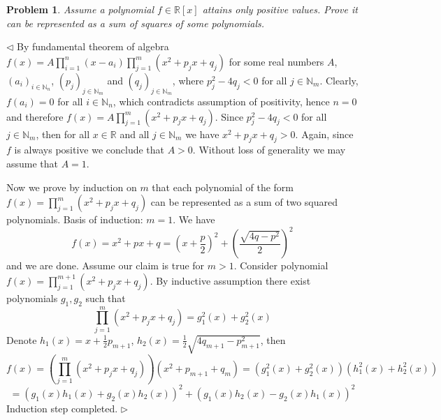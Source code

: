 \documentclass[12pt]{article}
\newtheorem{problem}{Problem}[subsection]
\newenvironment{solution}{\par $\triangleleft$}{$\triangleright$}
\begin{document}
\begin{problem} Assume a polynomial $f\in \mathbb{R}[x]$ attains only positive values. Prove it can be represented as a sum of squares of some polynomials.
\end{problem}
\begin{solution} By fundamental theorem of algebra
$f(x)=A\prod_{i=1}^n(x-a_i)\prod_{j=1}^m(x^2+p_jx+q_j)$
for some real numbers $A$, $(a_i)_{i\in\mathbb{N}_n}$, $(p_j)_{j\in\mathbb{N}_m}$ and $(q_j)_{j\in\mathbb{N}_m}$, where $p_j^2-4q_j<0$ for all $j\in\mathbb{N}_m$. Clearly, $f(a_i)=0$ for all $i\in\mathbb{N}_n$, which contradicts assumption of positivity, hence $n=0$ and therefore 
$f(x)=A\prod_{j=1}^m(x^2+p_jx+q_j)$. Since $p_j^2-4q_j<0$ for all $j\in\mathbb{N}_m$, then for all $x\in\mathbb{R}$ and all $j\in\mathbb{N}_m$ we have $x^2+p_jx+q_j>0$. Again, since $f$ is always positive we conclude that $A>0$. Without loss of generality we may assume that $A=1$. 
 
Now we prove by induction on $m$ that each polynomial of the form $f(x)=\prod_{j=1}^m(x^2+p_jx+q_j)$ can be represented as a sum of two squared polynomials. Basis of induction: $m=1$. We have
$$
f(x)=x^2+px+q
=\left(x+\frac{p}{2}\right)^2+\left(\frac{\sqrt{4q-p^2}}{2}\right)^2
$$
and we are done. Assume our claim is true for $m>1$. Consider polynomial $f(x)=\prod_{j=1}^{m+1} (x^2+p_jx+q_j)$. By inductive assumption there exist polynomials $g_1, g_2$ such that
$$
\prod_{j=1}^{m} (x^2+p_jx+q_j)=g_1^2(x)+g_2^2(x)
$$
Denote $h_1(x)=x+\frac{1}{2}p_{m+1}$, $h_2(x)=\frac{1}{2}\sqrt{4q_{m+1}-p_{m+1}^2}$, then
$$
f(x)=\left(\prod_{j=1}^{m} (x^2+p_jx+q_j)\right) (x^2+p_{m+1}+q_m)=(g_1^2(x)+g_2^2(x))(h_1^2(x)+h_2^2(x))
$$
$$
=(g_1(x)h_1(x)+g_2(x)h_2(x))^2+(g_1(x)h_2(x)-g_2(x)h_1(x))^2
$$
Induction step completed.
\end{solution}
 
\end{document}
